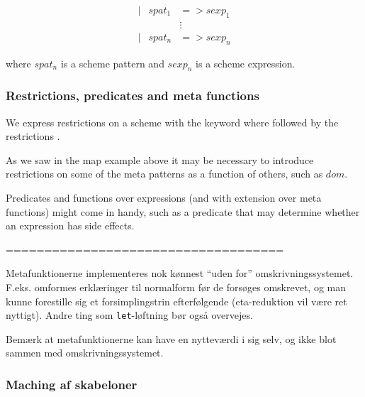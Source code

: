 \begin{eqnarray*}[rqrl]
| & spat_1 & => sexp_1 \\
  &  & \vdots \\
| & spat_n & => sexp_n
\end{eqnarray*}

where $spat_n$ is a scheme pattern and $sexp_n$ is a scheme expression.


\subsubsection{Restrictions, predicates and meta functions}


We express restrictions on a scheme with the keyword \textsf{where} followed by
the restrictions . 

As we saw in the \textsf{map} example above it may be necessary to introduce
restrictions on some of the meta patterns as a function of others, such as
$dom$.

Predicates and functions over expressions (and with extension over meta
functions)  might come in handy, such as a
predicate that may determine whether an expression has side effects.

====================================

Metafunktionerne implementeres nok kønnest ``uden for''
omskrivningssystemet. F.eks. omformes erklæringer til normalform før de
forsøges omskrevet, og man kunne forestille sig et forsimplingstrin
efterfølgende (eta-reduktion vil være ret nyttigt). Andre ting som
\texttt{let}-løftning bør også overvejes.

Bemærk at metafunktionerne kan have en nytteværdi i sig selv, og ikke blot
sammen med omskrivningssystemet.

\subsubsection{Maching af skabeloner}



